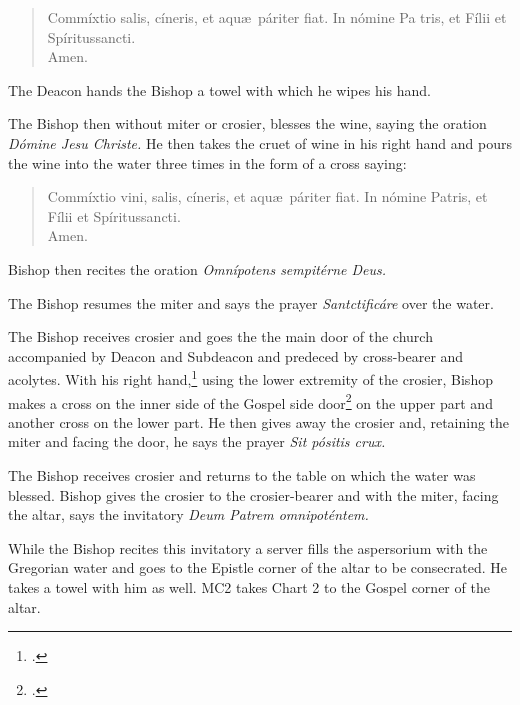 \documentclass[letterpaper]{report}
\begin{document}
{    \begin{quote}
        Commíxtio salis, cíneris, et aqu\ae\ páriter fiat. In nómine Pa\cross
        tris, et Fí\cross lii et Spíritus\cross sancti. \\
        \rbar Amen.
    \end{quote}

    The Deacon hands the Bishop a towel with which he wipes his hand.

    \rubric The Bishop then without miter or crosier, blesses the wine, saying
    the oration \textit{D\'omine Jesu Christe.} He then takes the cruet of wine
    in his right hand and pours the wine into the water three times in the form
    of a cross saying:

    \begin{quote}
        Commíxtio vini, salis, cíneris, et aqu\ae\ páriter fiat. In nómine
        Pa\cross tris, et Fí\cross lii et Spíritus\cross sancti. \\
        \rbar Amen.
    \end{quote}

    Bishop then recites the oration \textit{Omn\'ipotens sempit\'erne Deus.}

    \rubric The Bishop resumes the miter and says the prayer
    \textit{Santcti\cross ficáre} over the water.

    \rubric The Bishop receives crosier and goes the the main door of the
    church accompanied by Deacon and Subdeacon and predeced by cross-bearer and
    acolytes. With his right hand,\footcite[][p. 291.]{moretti:4} using the
    lower extremity of the crosier, Bishop makes a cross on the inner side of
    the Gospel side door\footcite[][p. 291]{moretti:4} on the upper part and
    another cross on the lower part. He then gives away the crosier and,
    retaining the miter and facing the door, he says the prayer \textit{Sit
    pósitis crux.}

    \rubric The Bishop receives crosier and returns to the table on which the
    water was blessed. Bishop gives the crosier to the crosier-bearer and with
    the miter, facing the altar, says the invitatory \textit{Deum Patrem
    omnipoténtem.}

    While the Bishop recites this invitatory a server fills the aspersorium
    with the Gregorian water and goes to the Epistle corner of the altar to be
    consecrated. He takes a towel with him as well. MC2 takes Chart 2 to the
    Gospel corner of the altar.

}
\end{document}

